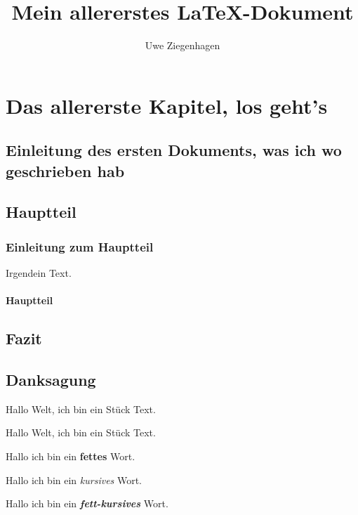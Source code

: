 \documentclass[15pt,ngerman]{scrbook}
\author{Uwe Ziegenhagen}
\title{Mein allererstes \LaTeX-Dokument}
\begin{document}
\maketitle

\tableofcontents

\chapter{Das allererste Kapitel, los geht's}

\section{Einleitung des ersten Dokuments, was ich wo geschrieben hab}

\blindtext

\section{Hauptteil}

\subsection{Einleitung zum Hauptteil}

Irgendein Text.

\subsubsection{Hauptteil}


\blindtext[2]

\blindtext[2]


\section{Fazit}

\blindtext[100]


\section{Danksagung}

Hallo Welt, ich bin ein Stück Text.

Hallo Welt, ich bin ein Stück Text.

Hallo ich bin ein \textbf{fettes} Wort.

Hallo ich bin ein \textit{kursives} Wort.

Hallo ich bin ein \textbf{\textit{fett-kursives}} Wort.
\end{document}
